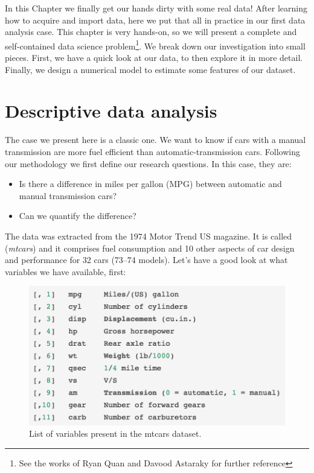 

In this Chapter we finally get our hands dirty with some real data! After learning how to acquire and import data, here we put that all in practice in our first data analysis case. This chapter is very hands-on, so we will present a complete and self-contained data science problem\footnote{See the works of Ryan Quan and Davood Astaraky for further reference}. We break down our investigation into small pieces. First, we have a quick look at our data, to then explore it in more detail. Finally, we design a numerical model to estimate some features of our dataset. 

\section{Descriptive data analysis}\label{initDA}

The case we present here is a classic one. We want to know if cars with a manual transmission are more fuel efficient than automatic-transmission cars. Following our methodology we first define our research questions. In this case, they are:
 
\begin{itemize}
\item Is there a difference in miles per gallon (MPG) between automatic and manual transmission cars?
\item Can we quantify the difference?
\end{itemize}

The data was extracted from the 1974 Motor Trend US magazine. It is called (\textit{mtcars}) and it comprises fuel consumption and 10 other aspects of car design and performance for 32 cars (73–74 models). Let's have a good look at what variables we have available, first:

\begin{figure}[ht]
	\begin{center}
			\includegraphics[scale=0.6]{Parts/numerics/desc1}
	\end{center}
	\caption{List of variables present in the mtcars dataset.}
	\label{fig:desc1}
\end{figure}

